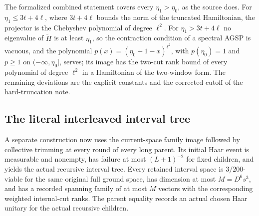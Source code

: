 \documentclass{article}
\begin{document}
The formalized combined statement covers every $\eta_1>\eta_0$, as the
source does. For $\eta_1\le3t+4\ell$, where $3t+4\ell$ bounds the norm of the
truncated Hamiltonian, the projector is the Chebyshev polynomial of degree
$\ell^2$. For $\eta_1>3t+4\ell$ no eigenvalue of $\tilde H$ is at least
$\eta_1$, so the contraction condition of a spectral AGSP is vacuous, and the
polynomial $p(x)=(\eta_0+1-x)^{\ell^2}$, with $p(\eta_0)=1$ and $p\ge1$ on
$(-\infty,\eta_0]$, serves; its image has the two-cut rank bound of every
polynomial of degree $\ell^2$ in a Hamiltonian of the two-window form. The
remaining deviations are the explicit constants and the corrected cutoff of
the hard-truncation note.


\subsection*{The literal interleaved interval tree}
A separate construction now uses the current-space family image followed
by collective trimming at every round of every long parent. Its initial
Haar event is measurable and nonempty, has failure at most $(L+1)^{-2}$
for fixed children, and yields the actual recursive interval tree.
Every retained interval space is $3/200$-viable for the same original
full ground space, has dimension at most $M=D^6s^3$, and has a recorded
spanning family of at most $M$ vectors with the corresponding weighted
internal-cut ranks. The parent equality records an actual chosen Haar
unitary for the actual recursive children.
\end{document}
